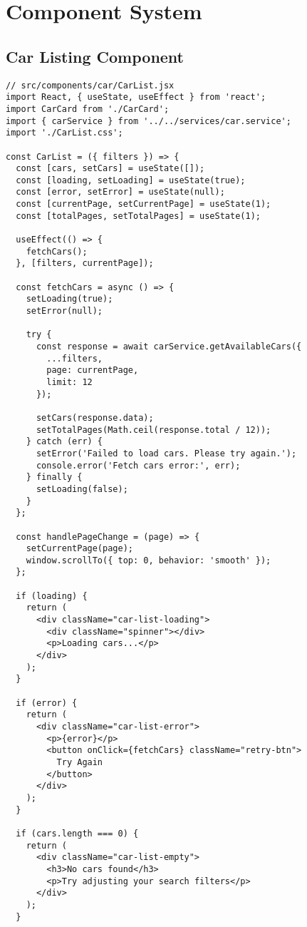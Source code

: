 \documentclass[12pt,a4paper]{article}
\begin{document}
\section{Component System}

\subsection{Car Listing Component}
\begin{lstlisting}[caption=CarList Component]
// src/components/car/CarList.jsx
import React, { useState, useEffect } from 'react';
import CarCard from './CarCard';
import { carService } from '../../services/car.service';
import './CarList.css';

const CarList = ({ filters }) => {
  const [cars, setCars] = useState([]);
  const [loading, setLoading] = useState(true);
  const [error, setError] = useState(null);
  const [currentPage, setCurrentPage] = useState(1);
  const [totalPages, setTotalPages] = useState(1);

  useEffect(() => {
    fetchCars();
  }, [filters, currentPage]);

  const fetchCars = async () => {
    setLoading(true);
    setError(null);
    
    try {
      const response = await carService.getAvailableCars({
        ...filters,
        page: currentPage,
        limit: 12
      });

      setCars(response.data);
      setTotalPages(Math.ceil(response.total / 12));
    } catch (err) {
      setError('Failed to load cars. Please try again.');
      console.error('Fetch cars error:', err);
    } finally {
      setLoading(false);
    }
  };

  const handlePageChange = (page) => {
    setCurrentPage(page);
    window.scrollTo({ top: 0, behavior: 'smooth' });
  };

  if (loading) {
    return (
      <div className="car-list-loading">
        <div className="spinner"></div>
        <p>Loading cars...</p>
      </div>
    );
  }

  if (error) {
    return (
      <div className="car-list-error">
        <p>{error}</p>
        <button onClick={fetchCars} className="retry-btn">
          Try Again
        </button>
      </div>
    );
  }

  if (cars.length === 0) {
    return (
      <div className="car-list-empty">
        <h3>No cars found</h3>
        <p>Try adjusting your search filters</p>
      </div>
    );
  }


\end{lstlisting}
\end{document}
